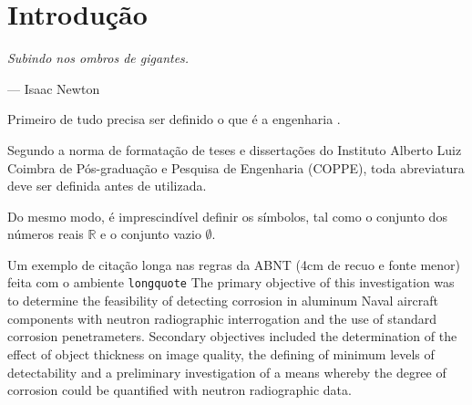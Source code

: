 \chapter{Introdu{\c c}\~ao}

\epigraph{\textit{Subindo nos ombros de gigantes.}}{--- Isaac Newton}

Primeiro de tudo precisa ser definido o que é a engenharia .

Segundo a norma de formata{\c c}\~ao de teses e disserta{\c c}\~oes do
Instituto Alberto Luiz Coimbra de P\'os-gradua{\c c}\~ao e Pesquisa de
Engenharia (COPPE), toda abreviatura deve ser definida antes de
utilizada.

Do mesmo modo, \'e imprescind\'ivel definir os s\'imbolos, tal como o
conjunto dos n\'umeros reais $\mathbb{R}$ e o conjunto vazio $\emptyset$.

\begin{longquote}
Um exemplo de citação longa nas regras da ABNT (4cm de recuo e fonte menor)
feita com o ambiente  \verb=longquote= The primary objective of this
investigation was to determine the feasibility of detecting corrosion in
aluminum Naval aircraft components with neutron radiographic interrogation
and the use of standard corrosion penetrameters. Secondary objectives
included the determination of the effect of object thickness on image quality,
the defining of minimum levels of detectability and a preliminary investigation
of a means whereby the degree of corrosion could be quantified with neutron
radiographic data. \cite{article-example}
\end{longquote}

